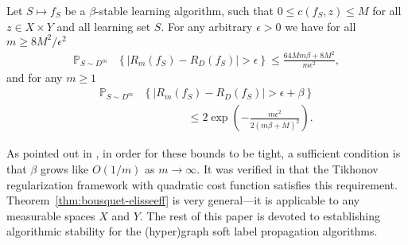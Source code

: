 \documentclass[letterpaper]{article} %
\begin{document}
\begin{theorem}
  \label{thm:bousquet-elisseeff}
  Let $S\mapsto f_S$ be a $\beta$-stable learning algorithm, such that $0\leq c \left( f_S,z \right)\leq M$ for all $z\in X\times Y$ and all learning set $S$. For any arbitrary $\epsilon>0$ we have for all $m\geq 8M^2/\epsilon^2$
  \begin{equation}
    \label{eq:fraction-bounds}
    \begin{aligned}
    \mathbb{P}_{S\sim D^m} &\left\{ \left| R_m \left( f_S \right)-R_D \left( f_S \right) \right| > \epsilon\right\}\leq \frac{64 Mm\beta+8M^2}{m\epsilon^2},
    \end{aligned}
  \end{equation}
  and for any $m\geq 1$
  \begin{equation}
    \label{eq:exponential-bounds}
    \begin{aligned}
    \mathbb{P}_{S\sim D^m}&\left\{ \left| R_m \left( f_S \right)-R_D \left( f_S \right) \right| > \epsilon+\beta\right\}\\
    &\qquad\qquad\leq 2\exp \left( -\frac{m\epsilon^2}{2 \left( m\beta+M \right)^2} \right).
    \end{aligned}
  \end{equation}
\end{theorem}
As pointed out in \cite{Algorithmic_Stability}, in order for these bounds to be tight, a sufficient condition is that $\beta$ grows like $O \left( 1/m \right)$ as $m\rightarrow\infty$. It was verified in \cite{Algorithmic_Stability} that the Tikhonov regularization framework with quadratic cost function satisfies this requirement. Theorem~\ref{thm:bousquet-elisseeff} is very general---it is applicable to any measurable spaces $X$ and $Y$. The rest of this paper is devoted to establishing algorithmic stability for the (hyper)graph soft label propagation algorithms. %
\end{document}
